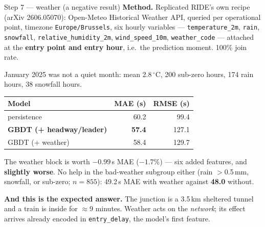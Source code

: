 \documentclass[aspectratio=169,10pt]{beamer}
\newcommand{\srcnote}[1]{{\scriptsize\color{ink3}#1}}
\newcommand{\hl}[1]{{\color{corange}\textbf{#1}}}
\begin{document}
\begin{frame}{Step 7 --- weather (a negative result)}
  \textbf{Method.} Replicated RIDE's own recipe (arXiv 2606.05070): Open-Meteo Historical
  Weather API, queried per operational point, timezone \texttt{Europe/Brussels}, six hourly
  variables --- \texttt{temperature\_2m}, \texttt{rain}, \texttt{snowfall},
  \texttt{relative\_humidity\_2m}, \texttt{wind\_speed\_10m}, \texttt{weather\_code} ---
  attached at the \hl{entry point and entry hour}, i.e.\ the prediction moment.
  100\% join rate.

  \vspace{0.4em}
  \srcnote{January 2025 was not a quiet month: mean 2.8\,$^\circ$C, 200 sub-zero hours,
  174 rain hours, 38 snowfall hours.}

  \vspace{0.4em}
  \centering\small
  \begin{tabular}{@{}lrr@{}}
    \toprule
    Model & MAE (s) & RMSE (s) \\
    \midrule
    persistence & 60.2 & 99.4 \\
    \textbf{GBDT (+ headway/leader)} & \textbf{57.4} & 127.1 \\
    GBDT (+ weather) & 58.4 & 129.7 \\
    \bottomrule
  \end{tabular}

  \vspace{0.5em}
  \raggedright\small
  The weather block is worth $-0.99$\,s MAE ($-1.7\%$) --- six added features, and
  \hl{slightly worse}. No help in the bad-weather subgroup either (rain $>$0.5\,mm, snowfall,
  or sub-zero; $n=855$): 49.2\,s MAE with weather against \textbf{48.0} without.

  \vspace{0.5em}
  \textbf{And this is the expected answer.} The junction is a 3.5\,km sheltered tunnel and a
  train is inside for $\approx$9 minutes. Weather acts on the \emph{network}; its effect
  arrives already encoded in \texttt{entry\_delay}, the model's first feature.
\end{frame}
\end{document}
